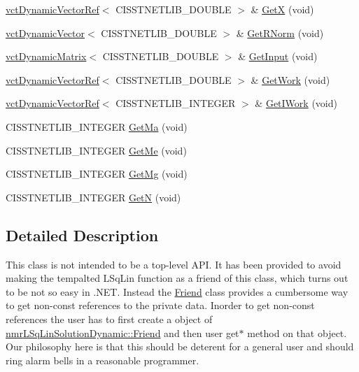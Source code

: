 \begin{DoxyCompactItemize}
\item 
\hyperlink{classvct_dynamic_vector_ref}{vct\+Dynamic\+Vector\+Ref}$<$ C\+I\+S\+S\+T\+N\+E\+T\+L\+I\+B\+\_\+\+D\+O\+U\+B\+L\+E $>$ \& \hyperlink{classnmr_l_sq_lin_solution_dynamic_1_1_friend_ac525854fc39b0d8147d68bdee71bed4e}{Get\+X} (void)
\item 
\hyperlink{classvct_dynamic_vector}{vct\+Dynamic\+Vector}$<$ C\+I\+S\+S\+T\+N\+E\+T\+L\+I\+B\+\_\+\+D\+O\+U\+B\+L\+E $>$ \& \hyperlink{classnmr_l_sq_lin_solution_dynamic_1_1_friend_a4d2bbf0dcbde09a93eb2d4e9a8872515}{Get\+R\+Norm} (void)
\item 
\hyperlink{classvct_dynamic_matrix}{vct\+Dynamic\+Matrix}$<$ C\+I\+S\+S\+T\+N\+E\+T\+L\+I\+B\+\_\+\+D\+O\+U\+B\+L\+E $>$ \& \hyperlink{classnmr_l_sq_lin_solution_dynamic_1_1_friend_a44485cbd2a634edbbfca73a68be4136d}{Get\+Input} (void)
\item 
\hyperlink{classvct_dynamic_vector_ref}{vct\+Dynamic\+Vector\+Ref}$<$ C\+I\+S\+S\+T\+N\+E\+T\+L\+I\+B\+\_\+\+D\+O\+U\+B\+L\+E $>$ \& \hyperlink{classnmr_l_sq_lin_solution_dynamic_1_1_friend_a247cd584f9fec9e74a3b693c01dc817b}{Get\+Work} (void)
\item 
\hyperlink{classvct_dynamic_vector_ref}{vct\+Dynamic\+Vector\+Ref}$<$ C\+I\+S\+S\+T\+N\+E\+T\+L\+I\+B\+\_\+\+I\+N\+T\+E\+G\+E\+R $>$ \& \hyperlink{classnmr_l_sq_lin_solution_dynamic_1_1_friend_ab457f473be3ba45f7dbbc41d7ed15c0b}{Get\+I\+Work} (void)
\item 
C\+I\+S\+S\+T\+N\+E\+T\+L\+I\+B\+\_\+\+I\+N\+T\+E\+G\+E\+R \hyperlink{classnmr_l_sq_lin_solution_dynamic_1_1_friend_ab38bee75a5527e2a72bdfdc6de8ba650}{Get\+Ma} (void)
\item 
C\+I\+S\+S\+T\+N\+E\+T\+L\+I\+B\+\_\+\+I\+N\+T\+E\+G\+E\+R \hyperlink{classnmr_l_sq_lin_solution_dynamic_1_1_friend_aaaf2bc7cea38419748585aa23a298a70}{Get\+Me} (void)
\item 
C\+I\+S\+S\+T\+N\+E\+T\+L\+I\+B\+\_\+\+I\+N\+T\+E\+G\+E\+R \hyperlink{classnmr_l_sq_lin_solution_dynamic_1_1_friend_afed79b5fe2a8ddbdc8c7f77756892eac}{Get\+Mg} (void)
\item 
C\+I\+S\+S\+T\+N\+E\+T\+L\+I\+B\+\_\+\+I\+N\+T\+E\+G\+E\+R \hyperlink{classnmr_l_sq_lin_solution_dynamic_1_1_friend_a8e27d5175fee9e58874f7f86393822cb}{Get\+N} (void)
\end{DoxyCompactItemize}


\subsection{Detailed Description}
This class is not intended to be a top-\/level A\+P\+I. It has been provided to avoid making the tempalted L\+Sq\+Lin function as a friend of this class, which turns out to be not so easy in .N\+E\+T. Instead the \hyperlink{classnmr_l_sq_lin_solution_dynamic_1_1_friend}{Friend} class provides a cumbersome way to get non-\/const references to the private data. Inorder to get non-\/const references the user has to first create a object of \hyperlink{classnmr_l_sq_lin_solution_dynamic_1_1_friend}{nmr\+L\+Sq\+Lin\+Solution\+Dynamic\+::\+Friend} and then user get$\ast$ method on that object. Our philosophy here is that this should be deterent for a general user and should ring alarm bells in a reasonable programmer. 

